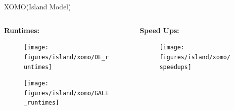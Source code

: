 \documentclass[10pt]{beamer}
\begin{document}
\begin{frame}{XOMO(Island Model)}
    \begin{columns}[t]
        \begin{column}{0.5\linewidth}
        \textbf{Runtimes:}
        \begin{figure}
            \centering
            \texttt{[image: figures/island/xomo/DE\_runtimes]}
            \label{fig:XOMO_DE_runtimes}
        \end{figure}
        \begin{figure}
            \centering
            \texttt{[image: figures/island/xomo/GALE\_runtimes]}
            \label{fig:XOMO_GALE_runtimes}
        \end{figure}
        \end{column}
        \begin{column}{0.5\linewidth}
        \textbf{Speed Ups:}
        \begin{figure}
            \centering
            \texttt{[image: figures/island/xomo/speedups]}
            \label{fig:XOMO_speedups}
        \end{figure}
        \end{column}
    \end{columns}
\end{frame}
\end{document}
